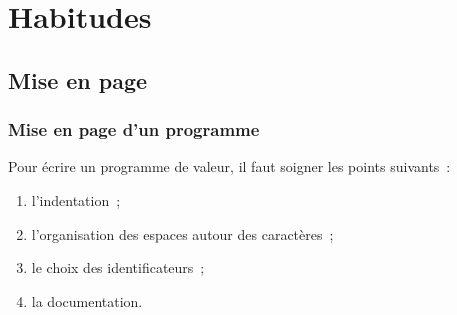 
\section{Habitudes}

\subsection{Mise en page}

\begin{frame} \frametitle{Mise en page d'un programme}
Pour écrire un programme de valeur, il faut soigner les points suivants~:
\medskip

\begin{enumerate}
    \item l'indentation~;
    \medskip
    
    \item l'organisation des espaces autour des caractères~;
    \medskip
    
    \item le choix des identificateurs~;
    \medskip
    
    \item la documentation.
\end{enumerate}
\end{frame}

